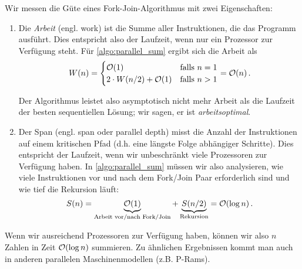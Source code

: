 Wir messen die Güte eines Fork-Join-Algorithmus mit zwei Eigenschaften:
\begin{enumerate}
    \item
          Die  \emph{Arbeit} (engl. work) ist die Summe aller Instruktionen, die das Programm ausführt.
          Dies entspricht also der Laufzeit, wenn nur ein Prozessor zur Verfügung steht.
          Für \cref{algo:parallel_sum} ergibt sich die Arbeit als
          \begin{equation}
              W(n) = \begin{cases}
                  \mathcal{O}\!\left(1\right)                  & \text{falls } n = 1 \\
                  2 \cdot W(n/2) + \mathcal{O}\!\left(1\right) & \text{falls } n > 1
              \end{cases}
              = \mathcal{O}\!\left(n\right).
          \end{equation}

          Der  Algorithmus leistet also asymptotisch nicht mehr Arbeit als die Laufzeit der besten sequentiellen Lösung; wir sagen, er ist \emph{arbeitsoptimal}.

    \item
          Der  Span (engl. span oder parallel depth) misst die Anzahl der Instruktionen auf einem kritischen Pfad (d.h. eine längste Folge abhängiger Schritte).
          Dies entspricht der Laufzeit, wenn wir unbeschränkt viele Prozessoren zur Verfügung haben.
          In \cref{algo:parallel_sum} müssen wir also analysieren, wie viele Instruktionen vor und nach dem Fork/Join Paar erforderlich sind und wie tief die Rekursion läuft:
          \begin{equation}
              S(n) = \underbrace{\mathcal{O}\!\left(1\right)}_\text{Arbeit vor/nach Fork/Join} + \underbrace{S(n/2)}_\text{Rekursion} = \mathcal{O}\!\left(\log n\right).
          \end{equation}
\end{enumerate}

Wenn wir ausreichend Prozessoren zur Verfügung haben, können wir also $n$ Zahlen in Zeit $\mathcal{O}\!\left(\log n\right)$ summieren.
Zu ähnlichen Ergebnissen kommt man auch in anderen parallelen Maschinenmodellen (z.B. P-Rams).


